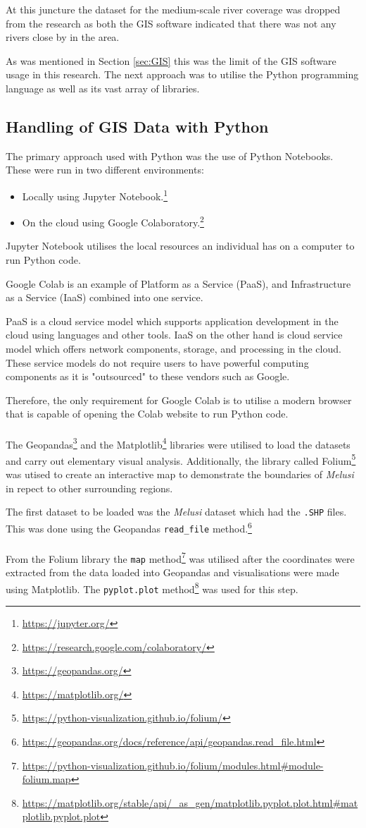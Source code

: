 At this juncture the dataset for the medium-scale river coverage was dropped from the research as both the GIS software indicated that there was not any rivers close by  in the area.

As was mentioned in Section \ref{sec:GIS} this was the limit of the GIS software usage in this research. The next approach was to utilise the Python programming language as well as its vast array of libraries.
\subsection{Handling of GIS Data with Python}
The primary approach used with Python was the use of Python Notebooks. These were run in two different environments:
\begin{itemize}
\item Locally using Jupyter Notebook.\footnote{\url{https://jupyter.org/}}
\item On the cloud using Google Colaboratory.\footnote{\url{https://research.google.com/colaboratory/}}
\end{itemize}
Jupyter Notebook utilises the local resources an individual has on a computer to run Python code.

Google Colab is an example of Platform as a Service (PaaS), and Infrastructure as a Service (IaaS) combined into one service.

PaaS is a cloud service model which supports application development in the cloud using languages and other tools. IaaS on the other hand is cloud service model which offers network components, storage, and processing in the cloud.\cite{pf} These service models do not require users to have powerful computing components as it is "outsourced" to these vendors such as Google.

Therefore, the only requirement for Google Colab is to utilise a modern browser that is capable of opening the Colab website to run Python code.
\\\\
The Geopandas\footnote{\url{https://geopandas.org/}} and the Matplotlib\footnote{\url{https://matplotlib.org/}} libraries were utilised to load the datasets and carry out elementary visual analysis. Additionally, the library called Folium\footnote{\url{https://python-visualization.github.io/folium/}} was utised to create an interactive map to demonstrate the boundaries of \textit{Melusi} in repect to other surrounding regions.

The first dataset to be loaded was the \textit{Melusi} dataset which had the \texttt{.SHP} files. This was done using the Geopandas \texttt{read\_file} method.\footnote{\url{https://geopandas.org/docs/reference/api/geopandas.read_file.html}}\\\\
From the Folium library the \texttt{map} method\footnote{\url{https://python-visualization.github.io/folium/modules.html\#module-folium.map}} was utilised after the coordinates were extracted from the data loaded into Geopandas and visualisations were made using Matplotlib. The \texttt{pyplot.plot} method\footnote{\url{https://matplotlib.org/stable/api/_as_gen/matplotlib.pyplot.plot.html\#matplotlib.pyplot.plot}} was used for this step.

